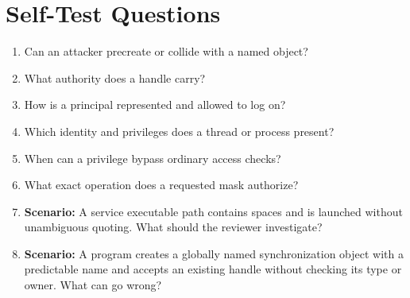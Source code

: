 \documentclass[11pt,letterpaper]{article}
\begin{document}
\section{Self-Test Questions}
\begin{enumerate}
\item Can an attacker precreate or collide with a named object?
\item What authority does a handle carry?
\item How is a principal represented and allowed to log on?
\item Which identity and privileges does a thread or process present?
\item When can a privilege bypass ordinary access checks?
\item What exact operation does a requested mask authorize?
\item \textbf{Scenario:} A service executable path contains spaces and is launched without unambiguous quoting. What should the reviewer investigate?
\item \textbf{Scenario:} A program creates a globally named synchronization object with a predictable name and accepts an existing handle without checking its type or owner. What can go wrong?
\end{enumerate}
\clearpage
\end{document}
